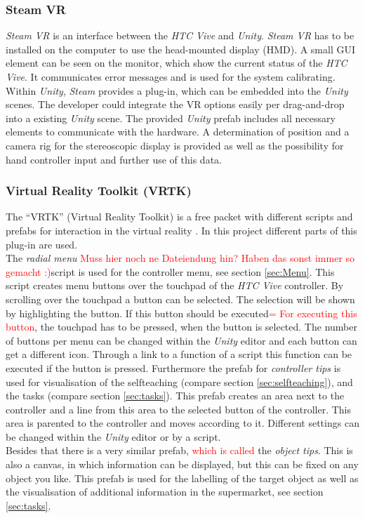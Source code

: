 \subsubsection{Steam VR}
\textit{Steam VR} \cite{website:steamVR} is an interface between the \textit{HTC Vive} and \textit{Unity}. \textit{Steam VR} has to be installed on the computer to use the head-mounted display (HMD). A small GUI element can be seen on the monitor, which show the current status of the \textit{HTC Vive}. It communicates error messages and is used for the system calibrating. \\
Within \textit{Unity}, \textit{Steam} provides a plug-in, which can be embedded into the \textit{Unity} scenes. The developer could integrate the VR options easily per drag-and-drop into a existing \textit{Unity} scene. 
The provided \textit{Unity} prefab includes all necessary elements to communicate with the hardware. A determination of position and a camera rig for the stereoscopic display is provided as well as the possibility for hand controller input and further use of this data.
	
\subsubsection{Virtual Reality Toolkit (VRTK)}\label{sec:VRTK}
The ``VRTK'' (Virtual Reality Toolkit) is a free packet with different scripts and prefabs for interaction in the virtual reality \cite{asset_VRTK} \cite{VRTK}. In this project different parts of this plug-in are used.\\ 
The \textit{radial menu} \textcolor{red}{Muss hier noch ne Dateiendung hin? Haben das sonst immer so gemacht :)}script is used for the controller menu, see section \ref{sec:Menu}. This script creates menu buttons over the touchpad of the \textit{HTC Vive} controller. By scrolling over the touchpad a button can be selected. The selection will be shown by highlighting the button. If this button should be executed\textcolor{red}{= For executing this button}, the touchpad has to be pressed, when the button is selected. The number of buttons per menu can be changed within the \textit{Unity} editor and each button can get a different icon. Through a link to a function of a script this function can be executed if the button is pressed.
Furthermore the prefab for \textit{controller tips} is used for visualisation of the selfteaching (compare section \ref{sec:selfteaching}), and the tasks (compare section \ref{sec:tasks}). This prefab creates an area next to the controller and a line from this area to the selected button of the controller. This area is parented to the controller and moves according to it. Different settings can be changed within the \textit{Unity} editor or by a script.\\
Besides that there is a very similar prefab, \textcolor{red}{which is called }the \textit{object tips}. This is also a canvas, in which information can be displayed, but this can be fixed on any object you like. This prefab is used for the labelling of the target object as well as the visualisation of additional information in the supermarket, see section \ref{sec:tasks}.

	\newpage
